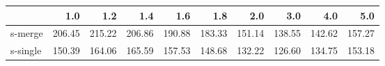 \begin{tabular}{lrrrrrrrrr}
\toprule
{} &    1.0 &    1.2 &    1.4 &    1.6 &    1.8 &    2.0 &    3.0 &    4.0 &    5.0 \\
\midrule
s-merge  & 206.45 & 215.22 & 206.86 & 190.88 & 183.33 & 151.14 & 138.55 & 142.62 & 157.27 \\
s-single & 150.39 & 164.06 & 165.59 & 157.53 & 148.68 & 132.22 & 126.60 & 134.75 & 153.18 \\
\bottomrule
\end{tabular}
